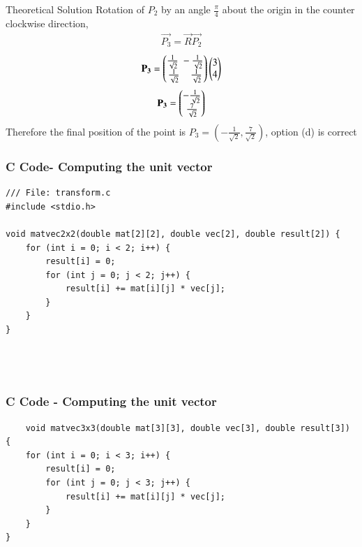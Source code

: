 \documentclass{beamer}
\begin{document}
    \begin{frame}{Theoretical Solution}
             Rotation of $P_2$ by an angle $\frac{\pi}{4}$ about the origin in the counter clockwise direction,
             \begin{align}
                 \vec{P_3}=\vec{R}\vec{P_2}
             \end{align}
             \begin{align}
                 \mathbf{P_3}=\begin{pmatrix}\frac{1}{\sqrt{2}}\;-\frac{1}{\sqrt{2}}\\\frac{1}{\sqrt{2}}\;\;\;\;\frac{1}{\sqrt{2}}\end{pmatrix}\begin{pmatrix}3\\4\end{pmatrix}
             \end{align}
             \begin{align}
                 \mathbf{P_3}=\begin{pmatrix}-\frac{1}{\sqrt{2}}\\\frac{7}{\sqrt{2}}\end{pmatrix}
             \end{align}
             Therefore the final position of the point is $P_3=(-\frac{1}{\sqrt{2}},\frac{7}{\sqrt{2}})$, option (d) is correct
    \end{frame}
	\begin{frame}[fragile]
	\frametitle{C Code- Computing the unit vector}
	
	\begin{lstlisting}
/// File: transform.c
#include <stdio.h>

void matvec2x2(double mat[2][2], double vec[2], double result[2]) {
    for (int i = 0; i < 2; i++) {
        result[i] = 0;
        for (int j = 0; j < 2; j++) {
            result[i] += mat[i][j] * vec[j];
        }
    }
}




	\end{lstlisting}
\end{frame}
\begin{frame}[fragile]
\frametitle{C Code - Computing the unit vector}
\begin{lstlisting}
    void matvec3x3(double mat[3][3], double vec[3], double result[3]) {
    for (int i = 0; i < 3; i++) {
        result[i] = 0;
        for (int j = 0; j < 3; j++) {
            result[i] += mat[i][j] * vec[j];
        }
    }
}
\end{lstlisting}
\end{frame}
\end{document}
